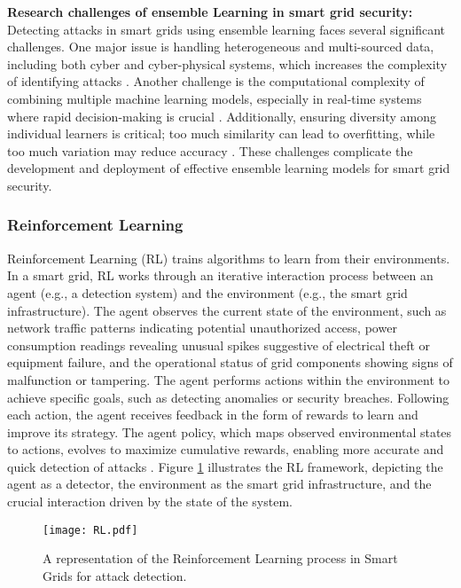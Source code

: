 \documentclass[10pt, journal]{IEEEtran}
\begin{document}
{\bf Research challenges of ensemble Learning in smart grid security:} Detecting attacks in smart grids using ensemble learning faces several significant challenges. One major issue is handling heterogeneous and multi-sourced data, including both cyber and cyber-physical systems, which increases the complexity of identifying attacks \cite{starke2022cross, hu2020adaptive}. Another challenge is the computational complexity of combining multiple machine learning models, especially in real-time systems where rapid decision-making is crucial \cite{sagi2018ensemble}. Additionally, ensuring diversity among individual learners is critical; too much similarity can lead to overfitting, while too much variation may reduce accuracy \cite{kuncheva2014combining}. These challenges complicate the development and deployment of effective ensemble learning models for smart grid security.
			

	
\subsubsection{Reinforcement Learning}

Reinforcement Learning (RL) trains algorithms to learn from their environments. In a smart grid, RL works through an iterative interaction process between an agent (e.g., a detection system) and the environment (e.g., the smart grid infrastructure). The agent observes the current state of the environment, such as network traffic patterns indicating potential unauthorized access, power consumption readings revealing unusual spikes suggestive of electrical theft or equipment failure, and the operational status of grid components showing signs of malfunction or tampering. The agent performs actions within the environment to achieve specific goals, such as detecting anomalies or security breaches. Following each action, the agent receives feedback in the form of rewards to learn and improve its strategy. The agent policy, which maps observed environmental states to actions, evolves to maximize cumulative rewards, enabling more accurate and quick detection of attacks \cite{sutton2018reinforcement}. Figure \ref{figure:RL} illustrates the RL framework, depicting the agent as a detector, the environment as the smart grid infrastructure, and the crucial interaction driven by the state of the system.


            \begin{figure}[htbp]
				\centering
				\texttt{[image: RL.pdf]}
				\caption{A representation of the Reinforcement Learning process in Smart Grids for attack detection.}
				\label{figure:RL}
			\end{figure}
\end{document}
